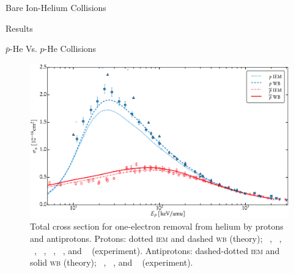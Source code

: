\documentclass[letterpaper, 11 pt]{report}
\begin{document}
\begin{chapter}{Bare Ion-Helium Collisions \label{chap:p-he2p-he}}
\begin{section}{Results \label{sec:phe2p-res}}
\begin{subsection}{ \texorpdfstring{$\bar{p}$}{pbar}-He Vs. \texorpdfstring{$p$}{p}-He Collisions
                         \label{sec:pbarhe-res}}
         \begin{figure}[t]
            \centering
            \includegraphics[width = 0.95 \linewidth]{./images/pbarhe/pbarhe-+.eps}
            \caption[Total cross section for one-electron removal from helium by protons and
                     antiprotons.]
                    {Total cross section for one-electron removal from helium by protons and
                     antiprotons. Protons: dotted \textsc{iem} and dashed \textsc{wb} (theory);
                     {\color{blue}{$\blacktriangle$}}~\cite{DTR84}, {\color{blue}{$+$}}~\cite{Sol62},
                     {\color{blue}{$\bullet$}}~\cite{SG89}, {\color{blue}{$\blacklozenge$}}~\cite{SG85},
                     {\color{blue}{$\blacktriangleright$}}~\cite{PM70},
                     {\color{blue}{$\blacktriangledown$}}~\cite{Wex64},
                     and {\color{blue}{$\blacksquare$}}~\cite{KAH84} (experiment).
                     Antiprotons: dashed-dotted \textsc{iem} and solid \textsc{wb} (theory);
                     {\color{red}{$\Box$}}~\cite{KKT08}, {\color{red}{$\circ$}}~\cite{HKM94},
                     and {\color{red}{$\times$}}~\cite{AHK90} (experiment). \label{fig:he+}}
         \end{figure}


\end{subsection}
\end{section}
\end{chapter}
\end{document}

